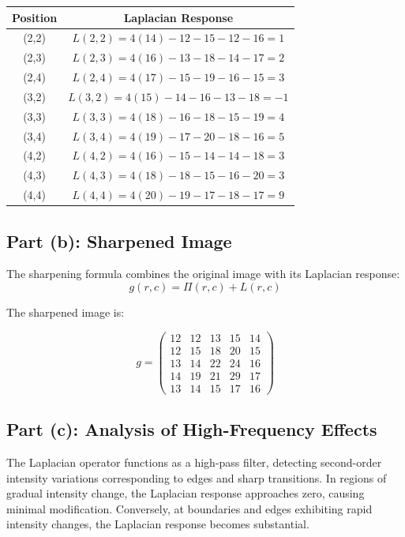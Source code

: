 \documentclass[12pt,a4paper]{article}
\begin{document}
\begin{center}
\begin{tabular}{|c|c|}
\hline
\textbf{Position} & \textbf{Laplacian Response} \\
\hline
(2,2) & $L(2,2) = 4(14) - 12 - 15 - 12 - 16 = 1$ \\
(2,3) & $L(2,3) = 4(16) - 13 - 18 - 14 - 17 = 2$ \\
(2,4) & $L(2,4) = 4(17) - 15 - 19 - 16 - 15 = 3$ \\
(3,2) & $L(3,2) = 4(15) - 14 - 16 - 13 - 18 = -1$ \\
(3,3) & $L(3,3) = 4(18) - 16 - 18 - 15 - 19 = 4$ \\
(3,4) & $L(3,4) = 4(19) - 17 - 20 - 18 - 16 = 5$ \\
(4,2) & $L(4,2) = 4(16) - 15 - 14 - 14 - 18 = 3$ \\
(4,3) & $L(4,3) = 4(18) - 18 - 15 - 16 - 20 = 3$ \\
(4,4) & $L(4,4) = 4(20) - 19 - 17 - 18 - 17 = 9$ \\
\hline
\end{tabular}
\end{center}

\subsection*{Part (b): Sharpened Image}

The sharpening formula combines the original image with its Laplacian response:
\begin{equation*}
g(r,c) = \Pi(r,c) + L(r,c)
\end{equation*}

The sharpened image is:

\begin{equation*}
g = \begin{pmatrix}
12 & 12 & 13 & 15 & 14 \\
12 & 15 & 18 & 20 & 15 \\
13 & 14 & 22 & 24 & 16 \\
14 & 19 & 21 & 29 & 17 \\
13 & 14 & 15 & 17 & 16
\end{pmatrix}
\end{equation*}

\subsection*{Part (c): Analysis of High-Frequency Effects}

The Laplacian operator functions as a high-pass filter, detecting second-order intensity variations corresponding to edges and sharp transitions. In regions of gradual intensity change, the Laplacian response approaches zero, causing minimal modification. Conversely, at boundaries and edges exhibiting rapid intensity changes, the Laplacian response becomes substantial.
\end{document}
